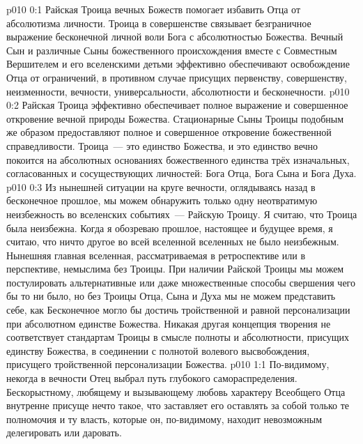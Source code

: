 \author{Всеобщий Цензор}
\vs p010 0:1 Райская Троица вечных Божеств помогает избавить Отца от абсолютизма личности. Троица в совершенстве связывает безграничное выражение бесконечной личной воли Бога с абсолютностью Божества. Вечный Сын и различные Сыны божественного происхождения вместе с Совместным Вершителем и его вселенскими детьми эффективно обеспечивают освобождение Отца от ограничений, в противном случае присущих первенству, совершенству, неизменности, вечности, универсальности, абсолютности и бесконечности.
\vs p010 0:2 Райская Троица эффективно обеспечивает полное выражение и совершенное откровение вечной природы Божества. Стационарные Сыны Троицы подобным же образом предоставляют полное и совершенное откровение божественной справедливости. Троица~--- это единство Божества, и это единство вечно покоится на абсолютных основаниях божественного единства трёх изначальных, согласованных и сосуществующих личностей: Бога Отца, Бога Сына и Бога Духа.
\vs p010 0:3 \pc Из нынешней ситуации на круге вечности, оглядываясь назад в бесконечное прошлое, мы можем обнаружить только одну неотвратимую неизбежность во вселенских событиях~--- Райскую Троицу. Я считаю, что Троица была неизбежна. Когда я обозреваю прошлое, настоящее и будущее время, я считаю, что ничто другое во всей вселенной вселенных не было неизбежным. Нынешняя главная вселенная, рассматриваемая в ретроспективе или в перспективе, немыслима без Троицы. При наличии Райской Троицы мы можем постулировать альтернативные или даже множественные способы свершения чего бы то ни было, но без Троицы Отца, Сына и Духа мы не можем представить себе, как Бесконечное могло бы достичь тройственной и равной персонализации при абсолютном единстве Божества. Никакая другая концепция творения не соответствует стандартам Троицы в смысле полноты и абсолютности, присущих единству Божества, в соединении с полнотой волевого высвобождения, присущего тройственной персонализации Божества.
\vs p010 1:1 По\hyp{}видимому, некогда в вечности Отец выбрал путь глубокого самораспределения. Бескорыстному, любящему и вызывающему любовь характеру Всеобщего Отца внутренне присуще нечто такое, что заставляет его оставлять за собой только те полномочия и ту власть, которые он, по\hyp{}видимому, находит невозможным делегировать или даровать.
